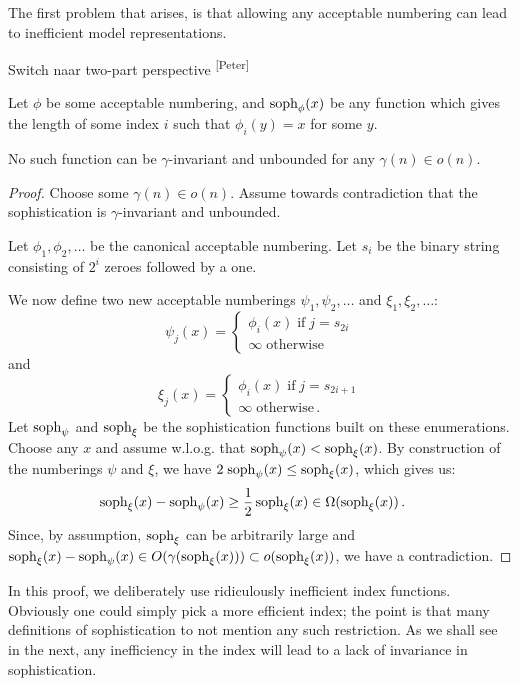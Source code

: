 \documentclass{style/llncs}
\newcommand{\tn}[1]{\textnormal{#1}}
\newcommand{\s}{\tn{soph}}
\newcommand{\num}[1]{#1_1, #1_2, \ldots}
\newcommand{\p}{\,\text{.}}
\newcommand{\pb}[1]{\textcolor{OliveGreen}{\small #1 \textsuperscript{[Peter]} }}
\begin{document}
The first problem that arises, is that allowing any acceptable numbering can lead to inefficient model representations.

\pb{Switch naar two-part perspective}
\begin{lemma}
Let $\phi$ be some acceptable numbering, and $\s_\phi(x)$ be any function which gives the length of some index $i$ such that $\phi_i(y) = x$ for some $y$.

No such function can be $\gamma$-invariant and unbounded for any $\gamma(n) \in o(n)$.
\end{lemma}
\begin{proof}
Choose some $\gamma(n) \in o(n)$. Assume towards contradiction that the sophistication is $\gamma$-invariant and unbounded.

Let $\num{\phi}$ be the canonical acceptable numbering. Let $s_i$ be the binary string consisting of $2^{i}$ zeroes followed by a one.

We now define two new acceptable numberings $\num{\psi}$ and $\num{\xi}$:
\[
\psi_j(x) = 
\begin{cases}
	\phi_i(x) \;\text{if}\; j = s_{2i}\\
	\infty\;\text{otherwise}
\end{cases}
\]
and 
\[
\xi_j(x) = 
\begin{cases}
	\phi_i(x) \;\text{if}\; j = s_{2i+1} \\
	\infty \;\text{otherwise}\p
\end{cases}
\]
Let $\s_\psi$ and $\s_\xi$ be the sophistication functions built on these enumerations. Choose any $x$ and assume w.l.o.g. that $\s_\psi(x) < \s_\xi(x)$. By construction of the numberings $\psi$ and $\xi$, we have $2\;\s_\psi(x)  \leq \s_\xi(x)$, which gives us:
\begin{align*}
	\s_\xi(x) - \s_\psi(x) &\geq \frac{1}{2}\, \s_\xi(x)  \in \Omega(\s_\xi(x))\p 
\end{align*}
Since, by assumption, $\s_\xi$ can be arbitrarily large and $\s_\xi(x) - \s_\psi(x) \in O(\gamma(\s_\xi(x))) \subset o(\s_\xi(x))$, we have a contradiction.
\end{proof}

In this proof, we deliberately use ridiculously inefficient index functions. Obviously one could simply pick a more efficient index; the point is that many definitions of sophistication to not mention any such restriction. As we shall see in the next, any inefficiency in the index will lead to a lack of invariance in sophistication.
\end{document}
